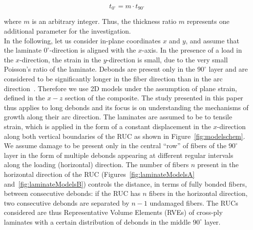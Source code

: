 \documentclass[Review,sagev,times]{sagej}
\begin{document}
\begin{equation}\label{eq:t90}
t_{0^{\circ}}=m\cdot t_{90^{\circ}}
\end{equation}

where $m$ is an arbitrary integer. Thus, the thickness ratio $m$ represents one additional parameter for the investigation.\\
In the following, let us consider in-plane coordinates $x$ and $y$, and assume that the laminate $0^{\circ}$-direction is aligned with the $x$-axis. In the presence of a load in the $x$-direction, the strain in the $y$-direction is small, due to the very small Poisson's ratio of the laminate. Debonds are present only in the $90^{\circ}$ layer and are considered to be significantly longer in the fiber direction than in the arc direction~\cite{Zhang1997}. Therefore we use 2D models under the assumption of plane strain, defined in the $x-z$ section of the composite. The study presented in this paper thus applies to long debonds and its focus is on understanding the mechanisms of growth along their arc direction. The laminates are assumed to be  to tensile strain, which is applied in the form of a constant displacement in the $x$-direction along both vertical boundaries of the RUC as shown in  Figure~\ref{fig:modelschem}.\\
We assume damage to be present only in the central ``row'' of fibers of the $90^{\circ}$ layer in the form of multiple debonds appearing at different regular intervals along the loading (horizontal) direction. The number of fibers $n$ present in the horizontal direction of the RUC (Figures~\ref{fig:laminateModelsA} and~\ref{fig:laminateModelsB}) controls the distance, in terms of fully bonded fibers, between consecutive debonds: if the RUC has $n$ fibers in the horizontal direction, two consecutive debonds are separated by $n-1$ undamaged fibers.  The RUCs considered are thus Representative Volume Elements (RVEs) of cross-ply laminates with a certain distribution of debonds in the middle $90^{\circ}$ layer.\\
\end{document}
